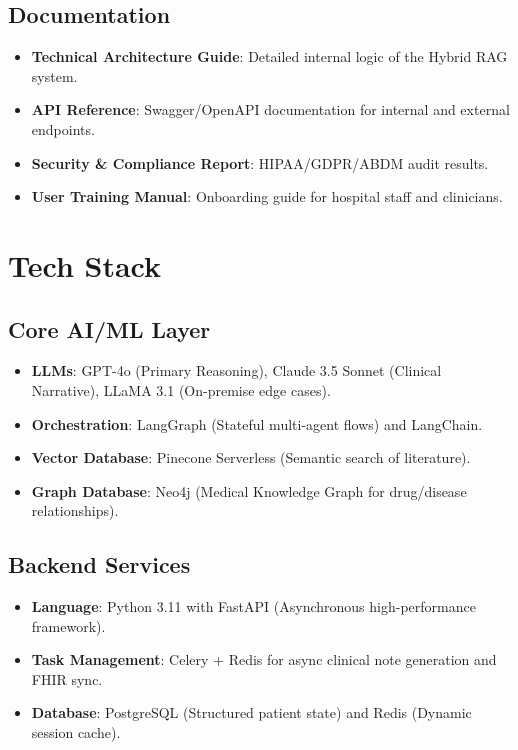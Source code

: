 \documentclass[12pt,a4paper]{article}
\begin{document}
\subsection{Documentation}
\begin{itemize}
    \item \textbf{Technical Architecture Guide}: Detailed internal logic of the Hybrid RAG system.
    \item \textbf{API Reference}: Swagger/OpenAPI documentation for internal and external endpoints.
    \item \textbf{Security \& Compliance Report}: HIPAA/GDPR/ABDM audit results.
    \item \textbf{User Training Manual}: Onboarding guide for hospital staff and clinicians.
\end{itemize}

\section{Tech Stack}

\subsection{Core AI/ML Layer}
\begin{itemize}
    \item \textbf{LLMs}: GPT-4o (Primary Reasoning), Claude 3.5 Sonnet (Clinical Narrative), LLaMA 3.1 (On-premise edge cases).
    \item \textbf{Orchestration}: LangGraph (Stateful multi-agent flows) and LangChain.
    \item \textbf{Vector Database}: Pinecone Serverless (Semantic search of literature).
    \item \textbf{Graph Database}: Neo4j (Medical Knowledge Graph for drug/disease relationships).
\end{itemize}

\subsection{Backend Services}
\begin{itemize}
    \item \textbf{Language}: Python 3.11 with FastAPI (Asynchronous high-performance framework).
    \item \textbf{Task Management}: Celery + Redis for async clinical note generation and FHIR sync.
    \item \textbf{Database}: PostgreSQL (Structured patient state) and Redis (Dynamic session cache).
\end{itemize}
\end{document}
